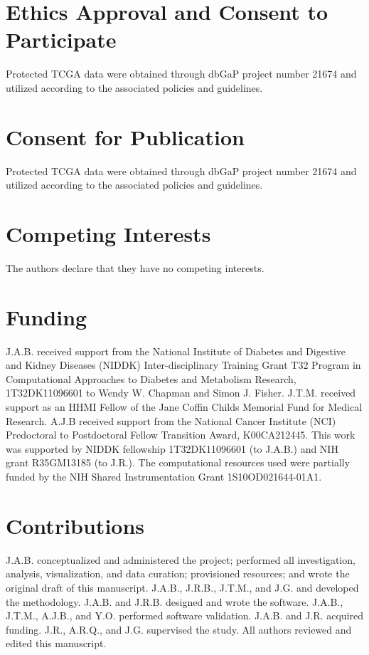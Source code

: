 \documentclass[10pt, oneside]{article}
\begin{document}
\section*{Ethics Approval and Consent to Participate}
Protected TCGA data were obtained through dbGaP project number 21674 and utilized according to the associated policies and guidelines.\\

\section*{Consent for Publication}
Protected TCGA data were obtained through dbGaP project number 21674 and utilized according to the associated policies and guidelines.\\

\section*{Competing Interests}
The authors declare that they have no competing interests.\\

\section*{Funding}
J.A.B. received support from the National Institute of Diabetes and Digestive and Kidney Diseases (NIDDK) Inter-disciplinary Training Grant T32 Program in Computational Approaches to Diabetes and Metabolism Research, 1T32DK11096601 to Wendy W. Chapman and Simon J. Fisher. J.T.M. received support as an HHMI Fellow of the Jane Coffin Childs Memorial Fund for Medical Research. A.J.B received support from the National Cancer Institute (NCI) Predoctoral to Postdoctoral Fellow Transition Award, K00CA212445. This work was supported by NIDDK fellowship 1T32DK11096601 (to J.A.B.) and NIH grant R35GM13185 (to J.R.). The computational resources used were partially funded by the NIH Shared Instrumentation Grant 1S10OD021644-01A1.\\

\section*{Contributions}
J.A.B. conceptualized and administered the project; performed all investigation, analysis, visualization, and data curation; provisioned resources; and wrote the original draft of this manuscript. J.A.B., J.R.B., J.T.M., and J.G. and developed the methodology. J.A.B. and J.R.B. designed and wrote the software. J.A.B., J.T.M., A.J.B., and Y.O. performed software validation. J.A.B. and J.R. acquired funding. J.R., A.R.Q., and J.G. supervised the study. All authors reviewed and edited this manuscript.\\
\end{document}
